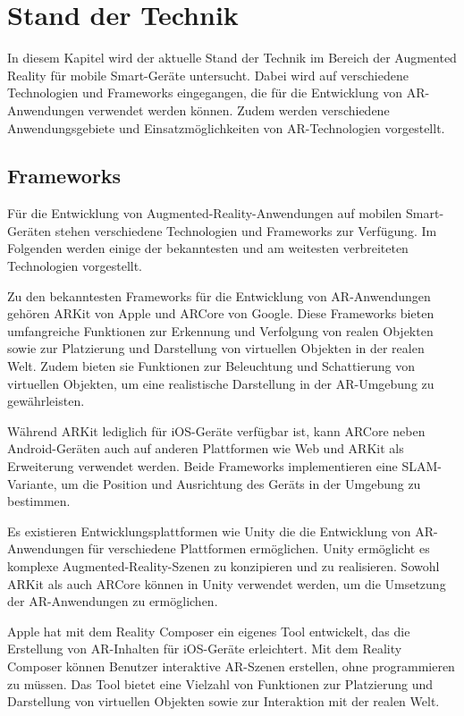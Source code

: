 \chapter{Stand der Technik}

In diesem Kapitel wird der aktuelle Stand der Technik im Bereich der Augmented Reality für mobile Smart-Geräte untersucht. Dabei wird auf verschiedene Technologien und Frameworks eingegangen, die für die Entwicklung von AR-Anwendungen verwendet werden können. Zudem werden verschiedene Anwendungsgebiete und Einsatzmöglichkeiten von AR-Technologien vorgestellt. 

\section{Frameworks}

Für die Entwicklung von Augmented-Reality-Anwendungen auf mobilen Smart-Geräten stehen verschiedene Technologien und Frameworks zur Verfügung. Im Folgenden werden einige der bekanntesten und am weitesten verbreiteten Technologien vorgestellt.

Zu den bekanntesten Frameworks für die Entwicklung von AR-Anwendungen gehören ARKit von Apple und ARCore von Google. Diese Frameworks bieten umfangreiche Funktionen zur Erkennung und Verfolgung von realen Objekten sowie zur Platzierung und Darstellung von virtuellen Objekten in der realen Welt. Zudem bieten sie Funktionen zur Beleuchtung und Schattierung von virtuellen Objekten, um eine realistische Darstellung in der AR-Umgebung zu gewährleisten.

Während ARKit lediglich für iOS-Geräte verfügbar ist, kann ARCore neben Android-Geräten auch auf anderen Plattformen wie Web und ARKit als Erweiterung verwendet werden. Beide Frameworks implementieren eine SLAM-Variante, um die Position und Ausrichtung des Geräts in der Umgebung zu bestimmen.

Es existieren Entwicklungsplattformen wie Unity die die Entwicklung von AR-Anwendungen für verschiedene Plattformen ermöglichen. Unity ermöglicht es komplexe Augmented-Reality-Szenen zu konzipieren und zu realisieren. Sowohl ARKit als auch ARCore können in Unity verwendet werden, um die Umsetzung der AR-Anwendungen zu ermöglichen.

Apple hat mit dem Reality Composer ein eigenes Tool entwickelt, das die Erstellung von AR-Inhalten für iOS-Geräte erleichtert. Mit dem Reality Composer können Benutzer interaktive AR-Szenen erstellen, ohne programmieren zu müssen. Das Tool bietet eine Vielzahl von Funktionen zur Platzierung und Darstellung von virtuellen Objekten sowie zur Interaktion mit der realen Welt.

